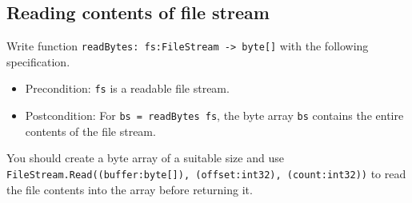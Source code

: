 \subsection*{Reading contents of file stream}

Write function \texttt{readBytes: fs:FileStream -> byte[]} with the following specification.  
\begin{itemize}
\item Precondition: \texttt{fs} is a readable file stream.
\item Postcondition: For \texttt{bs = readBytes fs}, the byte array \texttt{bs} contains the entire contents of the file stream.   
\end{itemize}

You should create a byte array of a suitable size and use \texttt{FileStream.Read((buffer:byte[]), (offset:int32), (count:int32))} to read the file contents into the array before returning it.
